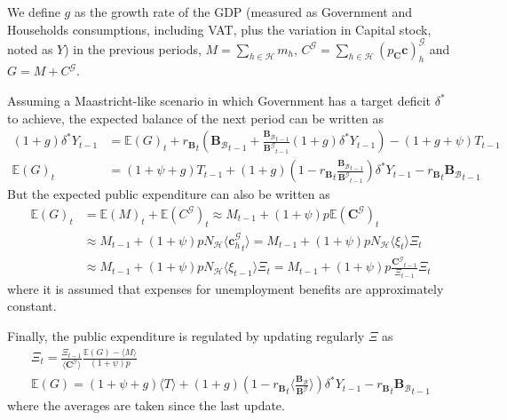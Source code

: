 \documentclass[a4paper, headings=standardclasses]{scrartcl}
\begin{document}
We define $g$ as the growth rate of the GDP (measured as Government and Households consumptions, including VAT, plus the variation in Capital stock, noted as $Y$) in the previous periods, $M = \sum_{h \in \mathcal{H}} m_h$, $C^\mathcal{G}= \sum_{h \in \mathcal{H}} (p_\mathbf{C} \mathbf{c})^\mathcal{G}_h$ and $G = M + C^\mathcal{G}$.

Assuming a Maastricht-like scenario in which Government has a target deficit $\delta^*$ to achieve, the expected balance of the next period can be written as
\begin{align*}
	(1+g) \delta^* Y_{t-1} & =  {\mathbb{E}(G)}_t + {r_\mathbf{B}}_t ({\mathbf{B}_\mathcal{B}}_{t-1} + \frac{{\mathbf{B}_\mathcal{B}}_{t-1}}{{\mathbf{B}^\mathcal{G}}_{t-1}} (1+g) \delta^* Y_{t-1}) - (1+g+\psi) T_{t-1} \\
	\mathbb{E}(G)_t        & = (1+\psi+g) T_{t-1} + (1+g)(1-{r_\mathbf{B}}_t \frac{{\mathbf{B}_\mathcal{B}}_{t-1}}{{\mathbf{B}^\mathcal{G}}_{t-1}})\delta^* Y_{t-1} - {r_\mathbf{B}}_t {\mathbf{B}_\mathcal{B}}_{t-1}
\end{align*}
But the expected public expenditure can also be written as
\begin{align*}
	\mathbb{E}(G)_t & = \mathbb{E}(M)_t + \mathbb{E}(C^\mathcal{G})_t \approx M_{t-1} + (1+\psi)p\mathbb{E}(\mathbf{C}^\mathcal{G})_t                                          \\
	                & \approx M_{t-1} + (1+\psi) p N_\mathcal{H} \langle {\mathbf{c}^\mathcal{G}_h}_t \rangle = M_{t-1} + (1+\psi) p N_\mathcal{H} \langle \xi_t \rangle \Xi_t \\
	                & \approx M_{t-1} + (1+\psi) p N_\mathcal{H} \langle \xi_{t-1} \rangle \Xi_t = M_{t-1} + (1+\psi) p \frac{{\mathbf{C}^\mathcal{G}}_{t-1}}{\Xi_{t-1}} \Xi_t
\end{align*}
where it is assumed that expenses for unemployment benefits are approximately constant.

Finally, the public expenditure is regulated by updating regularly $\Xi$ as
\begin{gather*}
	\Xi_t          = \frac{\Xi_{t-1}}{\langle {\mathbf{C}^\mathcal{G}} \rangle} \frac{\mathbb{E}(G) - \langle M \rangle}{(1+\psi)p}                                                                                       \\
	\mathbb{E}(G)  = (1+\psi+g) \langle T \rangle + (1+g)(1-{r_\mathbf{B}}_t \langle \frac{{\mathbf{B}_\mathcal{B}}}{{\mathbf{B}^\mathcal{G}}} \rangle)\delta^* Y_{t-1} - {r_\mathbf{B}}_t {\mathbf{B}_\mathcal{B}}_{t-1}
\end{gather*}
where the averages are taken since the last update.
\end{document}
